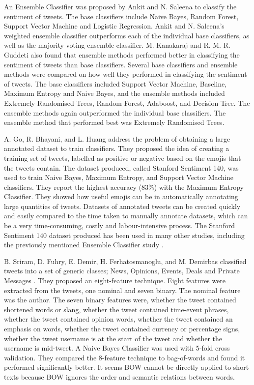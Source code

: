 An Ensemble Classifier was proposed by Ankit and N. Saleena \cite{Ankit2018} to classify the sentiment of tweets. The base classifiers include Naive Bayes, Random Forest, Support Vector Machine and Logistic Regression. Ankit and N. Saleena's weighted ensemble classifier outperforms each of the individual base classifiers, as well as the majority voting ensemble classifier. M. Kanakaraj and R. M. R. Guddeti \cite{Kanakaraj2015} also found that ensemble methods performed better in classifying the sentiment of tweets than base classifiers. Several base classifiers and ensemble methods were compared on how well they performed in classifying the sentiment of tweets. The base classifiers included Support Vector Machine, Baseline, Maximum Entropy and Naive Bayes, and the ensemble methods included Extremely Randomised Trees, Random Forest, Adaboost, and Decision Tree. The ensemble methods again outperformed the individual base classifiers. The ensemble method that performed best was Extremely Randomised Trees.

A. Go, R. Bhayani, and L. Huang \cite{Go2009} address the problem of obtaining a large annotated dataset to train classifiers. They proposed the idea of creating a training set of tweets, labelled as positive or negative based on the emojis that the tweets contain. The dataset produced, called Stanford Sentiment 140, was used to train Naive Bayes, Maximum Entropy, and Support Vector Machine classifiers. They report the highest accuracy (83\%) with the Maximum Entropy Classifier. They showed how useful emojis can be in automatically annotating large quantities of tweets. Datasets of annotated tweets can be created quickly and easily compared to the time taken to manually annotate datasets, which can be a very time-consuming, costly and labour-intensive process. The Stanford Sentiment 140 dataset produced has been used in many other studies, including the previously mentioned Ensemble Classifier study \cite{Ankit2018}.

B. Sriram, D. Fuhry, E. Demir, H. Ferhatosmanoglu, and M. Demirbas classified tweets into a set of generic classes; News, Opinions, Events, Deals and Private Messages \cite{sriram2010}. They proposed an eight-feature technique. Eight features were extracted from the tweets, one nominal and seven binary. The nominal feature was the author. The seven binary features were, whether the tweet contained shortened words or slang, whether the tweet contained time-event phrases, whether the tweet contained opinion words, whether the tweet contained an emphasis on words, whether the tweet contained currency or percentage signs, whether the tweet username is at the start of the tweet and whether the username is mid-tweet. A Naive Bayes Classifier was used with 5-fold cross validation. They compared the 8-feature technique to bag-of-words and found it performed significantly better. It seems BOW cannot be directly applied to short texts because BOW ignores the order and semantic relations between words.

